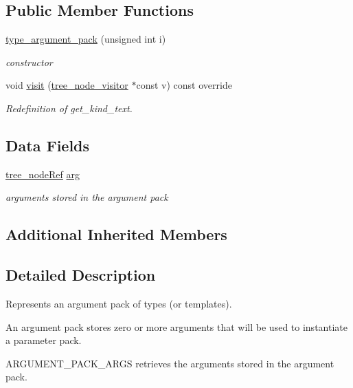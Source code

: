 \subsection*{Public Member Functions}
\begin{DoxyCompactItemize}
\item 
\hyperlink{structtype__argument__pack_a6fbc1b834a7fac561f6ee3c60724d98d}{type\+\_\+argument\+\_\+pack} (unsigned int i)
\begin{DoxyCompactList}\small\item\em constructor \end{DoxyCompactList}\item 
void \hyperlink{structtype__argument__pack_a1367b4b509c18a5ba865cccc463d6172}{visit} (\hyperlink{classtree__node__visitor}{tree\+\_\+node\+\_\+visitor} $\ast$const v) const override
\begin{DoxyCompactList}\small\item\em Redefinition of get\+\_\+kind\+\_\+text. \end{DoxyCompactList}\end{DoxyCompactItemize}
\subsection*{Data Fields}
\begin{DoxyCompactItemize}
\item 
\hyperlink{tree__node_8hpp_a6ee377554d1c4871ad66a337eaa67fd5}{tree\+\_\+node\+Ref} \hyperlink{structtype__argument__pack_af69775a9c65c2da8ce199e7d891277b5}{arg}
\begin{DoxyCompactList}\small\item\em arguments stored in the argument pack \end{DoxyCompactList}\end{DoxyCompactItemize}
\subsection*{Additional Inherited Members}


\subsection{Detailed Description}
Represents an argument pack of types (or templates). 

An argument pack stores zero or more arguments that will be used to instantiate a parameter pack.

A\+R\+G\+U\+M\+E\+N\+T\+\_\+\+P\+A\+C\+K\+\_\+\+A\+R\+GS retrieves the arguments stored in the argument pack.

